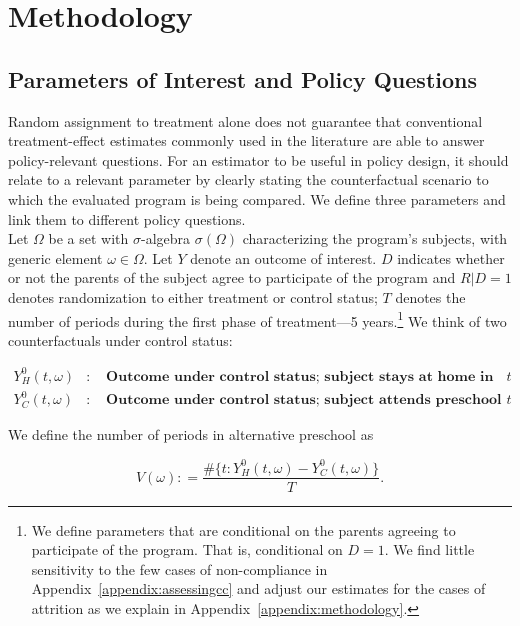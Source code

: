 \section{Methodology} \label{section:methodology}

\subsection{Parameters of Interest and Policy Questions} \label{section:methodsquestions}

\noindent Random assignment to treatment alone does not guarantee that conventional treatment-effect estimates commonly used in the literature are able to answer policy-relevant questions. For an estimator to be useful in policy design, it should relate to a relevant parameter by clearly stating the counterfactual scenario to which the evaluated program is being compared. We define three parameters and link them to different policy questions.\\ 

\noindent Let $\Omega$ be a set with $\sigma$-algebra $\sigma \left( \Omega \right)$ characterizing the program's subjects, with generic element $\omega \in \Omega$. Let $Y$ denote an outcome of interest. $D$ indicates whether or not the parents of the subject agree to participate of the program and $R | D = 1$ denotes randomization to either treatment or control status; $T$ denotes the number of periods during the first phase of treatment---5 years.\footnote{We define parameters that are conditional on the parents agreeing to participate of the program. That is, conditional on $D = 1$. We find little sensitivity to the few cases of non-compliance in Appendix~\ref{appendix:assessingcc} and adjust our estimates for the cases of attrition as we explain in Appendix~\ref{appendix:methodology}.} We think of two counterfactuals under control status: 

\begin{eqnarray}
Y_H^0 \left( t, \omega \right) &:& \textbf{ Outcome under control status; subject stays at home in period $t$} \nonumber \\ 
Y_C^0 \left( t, \omega \right) &:& \textbf{ Outcome under control status; subject attends preschool in period $t$}  \nonumber
\end{eqnarray}

\noindent We define the number of periods in alternative preschool as 

\begin{equation}
V \left ( \omega \right) : = \frac{\# \{ t: Y_H^0 \left( t, \omega \right) - Y_C^0 \left( t, \omega \right)  \} }{T}.
\end{equation}

